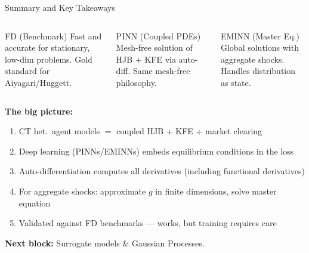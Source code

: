 \documentclass[aspectratio=169,11pt]{beamer}
\newcommand{\emphc}[1]{\textcolor{harvardcrimson}{#1}}
\begin{document}
\begin{frame}{Summary and Key Takeaways}
\begin{columns}[T]
\begin{block}{FD (Benchmark)}
\centering\small
\vspace{0.1em}
Fast and accurate for \emphc{stationary, low-dim} problems. Gold standard for Aiyagari/Huggett.
\vspace{0.1em}
\end{block}

\begin{block}{PINN (Coupled PDEs)}
\centering\small
\vspace{0.1em}
\emphc{Mesh-free} solution of HJB + KFE via auto-diff. Same mesh-free philosophy.
\vspace{0.1em}
\end{block}

\begin{block}{EMINN (Master Eq.)}
\centering\small
\vspace{0.1em}
\emphc{Global solutions} with aggregate shocks. Handles distribution as state.
\vspace{0.1em}
\end{block}
\end{columns}

\vspace{0.2em}
\small
\textbf{The big picture:}
\begin{enumerate}\itemsep0pt
    \item CT het.\ agent models $=$ coupled HJB + KFE + market clearing
    \item Deep learning (PINNs/EMINNs) embeds equilibrium conditions in the loss
    \item Auto-differentiation computes all derivatives (including functional derivatives)
    \item For aggregate shocks: approximate $g$ in finite dimensions, solve master equation
    \item Validated against FD benchmarks --- works, but training requires care
\end{enumerate}

\vspace{0.1em}
\begin{center}
\textbf{Next block:} Surrogate models \& Gaussian Processes.
\end{center}
\end{frame}
\end{document}
